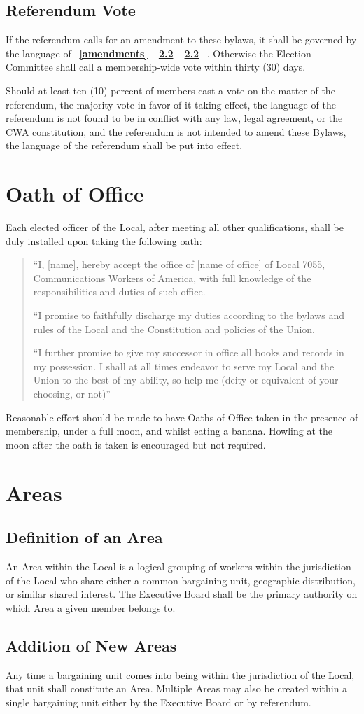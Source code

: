 \documentclass[11pt]{article}
\newcommand{\article}[1]{\vspace{.75cm}\section{#1}}
\newcommand{\articlesection}[1]{\vspace{.25cm}\subsection{#1}}
\newcommand{\fullref}[3]{%
  \mbox{\textbf{%
    \ifthenelse{\isempty{#1}}%
    {}%
    {\ref{#1}}%
    \ifthenelse{\isempty{#2}}%
    {}%
    {%
      \ifthenelse{\isempty{#1}}{}{, }%
      \ref{#2}%
    }%
    \ifthenelse{\isempty{#3}}%
    {}%
    {\ref{#3}}%
  }}%
}
\begin{document}
\articlesection{Referendum Vote}
\begin{paralist}
  \item If the referendum  calls for an amendment to these bylaws, it shall be governed by the language of \fullref{amendments}{}{}. Otherwise the Election Committee shall call a membership-wide vote within thirty (30) days.

  \item Should at least ten (10) percent of members cast a vote on the matter of the referendum, the majority vote in favor of it taking effect,  the language of the referendum  is not found to be in conflict with any law, legal agreement, or the CWA constitution, and the referendum is not intended to amend these Bylaws, the language of the referendum shall be put into effect.
\end{paralist}


\article{Oath of Office}
Each elected officer of the Local, after meeting all other qualifications, shall be duly installed upon taking the following oath:

\begin{quote}
``I, [name], hereby accept the office of [name of office] of Local 7055, Communications Workers of America, with full knowledge of the responsibilities and duties of such office.

``I promise to faithfully discharge my duties according to the bylaws and rules of the Local and the Constitution and policies of the Union.

``I further promise to give my successor in office all books and records in my possession. I shall at all times endeavor to serve my Local and the Union to the best of my ability, so help me (deity or equivalent of your choosing, or not)''
\end{quote}

Reasonable effort should be made to have Oaths of Office taken in the presence of membership, under a full moon, and whilst eating a banana. Howling at the moon after the oath is taken is encouraged but not required.


\article{Areas}\label{areas}
\articlesection{Definition of an Area}
An Area within the Local is a logical grouping of workers within the jurisdiction of the Local who share either a common bargaining unit, geographic distribution, or similar shared interest. The Executive Board shall be the primary authority on which Area a given member belongs to.

\articlesection{Addition of New Areas}
Any time a bargaining unit comes into being within the jurisdiction of the Local, that unit shall constitute an Area. Multiple Areas may also be created within a single bargaining unit either by the Executive Board or by referendum.
\end{document}
